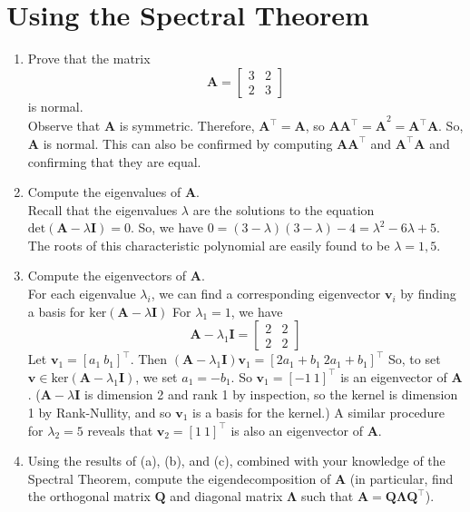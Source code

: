 \documentclass{article}
\begin{document}
\section{Using the Spectral Theorem}
\begin{enumerate}[label=\arabic*.]
\item Prove that the matrix $$\mathbf{A} = \begin{bmatrix} 3 & 2 \\ 2 & 3 \end{bmatrix}$$ is normal. \\
{\color{blue} Observe that $\mathbf{A}$ is symmetric. Therefore, $\mathbf{A^{\top}} = \mathbf{A}$, so $\mathbf{AA^{\top} = A}^2 = \mathbf{A^{\top}A}$. So, $\mathbf{A}$ is normal. This can also be confirmed by computing $\mathbf{AA^{\top}}$ and $\mathbf{A^{\top}A}$ and confirming that they are equal.}
\item Compute the eigenvalues of $\mathbf{A}$. \\
{\color{blue} Recall that the eigenvalues $\lambda$ are the solutions to the equation $\text{det}(\mathbf{A} - \lambda\mathbf{I}) = 0$. So, we have $0 = (3 - \lambda)(3 - \lambda) - 4 =\lambda^2 - 6\lambda + 5$. The roots of this characteristic polynomial are easily found to be $\lambda = 1, 5$.}
\item Compute the eigenvectors of $\mathbf{A}$. \\
{\color{blue} For each eigenvalue $\lambda_i$, we can find a corresponding eigenvector $\mathbf{v}_i$ by finding a basis for $\text{ker}(\mathbf{A} - \lambda\mathbf{I})$ For $\lambda_1 = 1$, we have $$\mathbf{A} - \lambda_1\mathbf{I} = \begin{bmatrix} 2 & 2 \\ 2 & 2 \end{bmatrix}$$ Let $\mathbf{v}_1 = [a_1\ b_1]^{\top}$. Then $(\mathbf{A} -\lambda_1\mathbf{I})\mathbf{v}_1 = [2a_1 + b_1\ 2a_1 + b_1]^{\top}$ So, to set $\mathbf{v} \in \text{ker}(\mathbf{A} - \lambda_1\mathbf{I})$, we set $a_1 = -b_1$. So $\mathbf{v}_1 = [-1\ 1]^{\top}$ is an eigenvector of $\mathbf{A}$. ($\mathbf{A} - \lambda\mathbf{I}$ is dimension 2 and rank 1 by inspection, so the kernel is dimension 1 by Rank-Nullity, and so $\mathbf{v}_1$ is a basis for the kernel.) A similar procedure for $\lambda_2 = 5$ reveals that $\mathbf{v}_2 = [1\ 1]^{\top}$ is also an eigenvector of $\mathbf{A}$.}
\item Using the results of (a), (b), and (c), combined with your knowledge of the Spectral Theorem, compute the eigendecomposition of $\mathbf{A}$ (in particular, find the orthogonal matrix $\mathbf{Q}$ and diagonal matrix $\mathbf{\Lambda}$ such that $\mathbf{A} = \mathbf{Q\Lambda Q^{\top}}$). \\

\end{enumerate}
\end{document}
